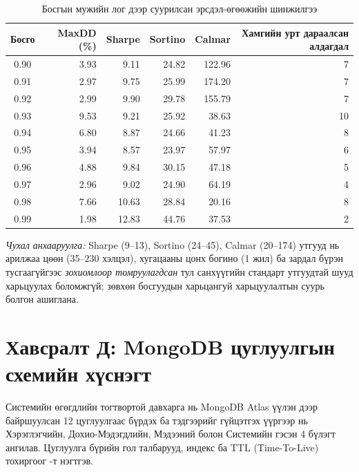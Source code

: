 \begin{table}[H]
\centering
\caption{Босгын мужийн лог дээр суурилсан эрсдэл-өгөөжийн шинжилгээ}
\label{tab:risk_metrics_log_based}
\setlength{\tabcolsep}{2.8pt}
\renewcommand{\arraystretch}{1.10}
\scriptsize
\begin{tabular}{|c|r|r|r|r|r|}
\hline
\textbf{Босго} & \textbf{MaxDD (\%)} & \textbf{Sharpe} & \textbf{Sortino} & \textbf{Calmar} & \textbf{Хамгийн урт дараалсан алдагдал} \\ \hline
0.90 & 3.93 & 9.11 & 24.82 & 122.96 & 7 \\ \hline
0.91 & 2.97 & 9.75 & 25.99 & 174.20 & 7 \\ \hline
0.92 & 2.99 & 9.90 & 29.78 & 155.79 & 7 \\ \hline
0.93 & 9.53 & 9.21 & 25.92 & 38.63 & 10 \\ \hline
0.94 & 6.80 & 8.87 & 24.66 & 41.23 & 8 \\ \hline
0.95 & 3.94 & 8.57 & 23.97 & 57.97 & 6 \\ \hline
0.96 & 4.88 & 9.84 & 30.15 & 47.18 & 5 \\ \hline
0.97 & 2.96 & 9.02 & 24.90 & 64.19 & 4 \\ \hline
0.98 & 7.66 & 10.63 & 28.84 & 20.16 & 8 \\ \hline
0.99 & 1.98 & 12.83 & 44.76 & 37.53 & 2 \\ \hline
\end{tabular}
\end{table}

\noindent\textit{Чухал анхааруулга:} Sharpe (9--13), Sortino (24--45), Calmar (20--174) утгууд нь арилжаа цөөн (35--230 хэлцэл), хугацааны цонх богино (1 жил) ба зардал бүрэн тусгаагүйгээс \textit{зохиомлоор томруулагдсан} тул санхүүгийн стандарт утгуудтай шууд харьцуулах боломжгүй; зөвхөн босгуудын харьцангуй харьцуулалтын суурь болгон ашиглана.

\section*{Хавсралт Д: MongoDB цуглуулгын схемийн хүснэгт}
\label{app:mongodb_schema}
\renewcommand{\thetable}{Д.\arabic{table}}
\renewcommand{\thefigure}{Д.\arabic{figure}}
\setcounter{table}{0}
\setcounter{figure}{0}

Системийн өгөгдлийн тогтвортой давхарга нь MongoDB Atlas үүлэн дээр байршуулсан 12 цуглуулгаас бүрдэх ба тэдгээрийг гүйцэтгэх үүргээр нь Хэрэглэгчийн, Дохио-Мэдэгдлийн, Мэдээний болон Системийн гэсэн 4 бүлэгт ангилав. Цуглуулга бүрийн гол талбарууд, индекс ба TTL (Time-To-Live) тохиргоог -т нэгтгэв.

